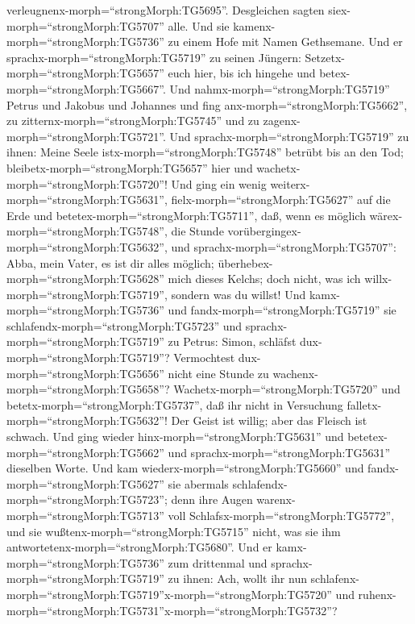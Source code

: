 verleugnenx-morph=``strongMorph:TG5695''. Desgleichen sagten
siex-morph=``strongMorph:TG5707'' alle.  Und sie
kamenx-morph=``strongMorph:TG5736'' zu einem Hofe mit Namen Gethsemane.
Und er sprachx-morph=``strongMorph:TG5719'' zu seinen Jüngern:
Setzetx-morph=``strongMorph:TG5657'' euch hier, bis ich hingehe und
betex-morph=``strongMorph:TG5667''.  Und
nahmx-morph=``strongMorph:TG5719'' Petrus und Jakobus und Johannes und
fing anx-morph=``strongMorph:TG5662'', zu
zitternx-morph=``strongMorph:TG5745'' und zu
zagenx-morph=``strongMorph:TG5721''.  Und
sprachx-morph=``strongMorph:TG5719'' zu ihnen: Meine Seele
istx-morph=``strongMorph:TG5748'' betrübt bis an den Tod;
bleibetx-morph=``strongMorph:TG5657'' hier und
wachetx-morph=``strongMorph:TG5720''!  Und ging ein wenig
weiterx-morph=``strongMorph:TG5631'', fielx-morph=``strongMorph:TG5627''
auf die Erde und betetex-morph=``strongMorph:TG5711'', daß, wenn es
möglich wärex-morph=``strongMorph:TG5748'', die Stunde
vorübergingex-morph=``strongMorph:TG5632'',  und
sprachx-morph=``strongMorph:TG5707'': Abba, mein Vater, es ist dir alles
möglich; überhebex-morph=``strongMorph:TG5628'' mich dieses Kelchs; doch
nicht, was ich willx-morph=``strongMorph:TG5719'', sondern was du
willst!  Und kamx-morph=``strongMorph:TG5736'' und
fandx-morph=``strongMorph:TG5719'' sie
schlafendx-morph=``strongMorph:TG5723'' und
sprachx-morph=``strongMorph:TG5719'' zu Petrus: Simon, schläfst
dux-morph=``strongMorph:TG5719''? Vermochtest
dux-morph=``strongMorph:TG5656'' nicht eine Stunde zu
wachenx-morph=``strongMorph:TG5658''? 
Wachetx-morph=``strongMorph:TG5720'' und
betetx-morph=``strongMorph:TG5737'', daß ihr nicht in Versuchung
falletx-morph=``strongMorph:TG5632''! Der Geist ist willig; aber das
Fleisch ist schwach.  Und ging wieder
hinx-morph=``strongMorph:TG5631'' und
betetex-morph=``strongMorph:TG5662'' und
sprachx-morph=``strongMorph:TG5631'' dieselben Worte.  Und
kam wiederx-morph=``strongMorph:TG5660'' und
fandx-morph=``strongMorph:TG5627'' sie abermals
schlafendx-morph=``strongMorph:TG5723''; denn ihre Augen
warenx-morph=``strongMorph:TG5713'' voll
Schlafsx-morph=``strongMorph:TG5772'', und sie
wußtenx-morph=``strongMorph:TG5715'' nicht, was sie ihm
antwortetenx-morph=``strongMorph:TG5680''.  Und er
kamx-morph=``strongMorph:TG5736'' zum drittenmal und
sprachx-morph=``strongMorph:TG5719'' zu ihnen: Ach, wollt ihr nun
schlafenx-morph=``strongMorph:TG5719''\textbar x-morph=``strongMorph:TG5720''
und
ruhenx-morph=``strongMorph:TG5731''\textbar x-morph=``strongMorph:TG5732''?
